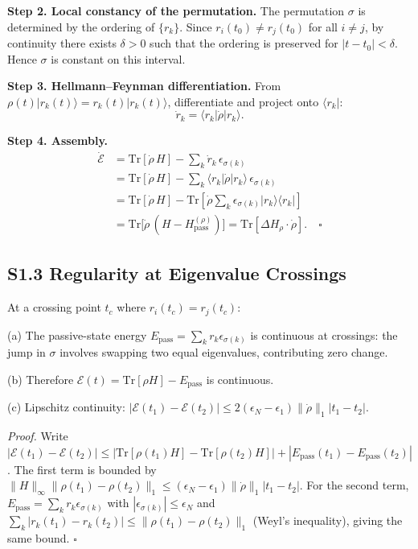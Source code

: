 \documentclass[prl,twocolumn,superscriptaddress,amsmath,amssymb]{revtex4-2}
\begin{document}
\textbf{Step 2. Local constancy of the permutation.}
The permutation $\sigma$ is determined by the ordering of $\{r_k\}$. Since $r_i(t_0) \neq r_j(t_0)$ for all $i \neq j$, by continuity there exists $\delta > 0$ such that the ordering is preserved for $|t - t_0| < \delta$. Hence $\sigma$ is constant on this interval.

\textbf{Step 3. Hellmann--Feynman differentiation.}
From $\rho(t)|r_k(t)\rangle = r_k(t)|r_k(t)\rangle$, differentiate and project onto $\langle r_k|$:
\begin{equation}
\dot r_k = \langle r_k|\dot\rho|r_k\rangle.
\end{equation}

\textbf{Step 4. Assembly.}
\begin{align}
\dot{\mathcal{E}} &= \mathrm{Tr}[\dot\rho\, H] - \sum_k \dot r_k\, \epsilon_{\sigma(k)} \nonumber\\
&= \mathrm{Tr}[\dot\rho\, H] - \sum_k \langle r_k|\dot\rho|r_k\rangle\, \epsilon_{\sigma(k)} \nonumber\\
&= \mathrm{Tr}[\dot\rho\, H] - \mathrm{Tr}\!\left[\dot\rho \sum_k \epsilon_{\sigma(k)}|r_k\rangle\langle r_k|\right] \nonumber\\
&= \mathrm{Tr}\!\bigl[\dot\rho\,(H - H_{\mathrm{pass}}^{(\rho)})\bigr] = \mathrm{Tr}[\Delta H_\rho \cdot \dot\rho]. \quad \square
\end{align}

\subsection{S1.3 Regularity at Eigenvalue Crossings}

At a crossing point $t_c$ where $r_i(t_c) = r_j(t_c)$:

(a) The passive-state energy $E_{\mathrm{pass}} = \sum_k r_k \epsilon_{\sigma(k)}$ is continuous at crossings: the jump in $\sigma$ involves swapping two equal eigenvalues, contributing zero change.

(b) Therefore $\mathcal{E}(t) = \mathrm{Tr}[\rho H] - E_{\mathrm{pass}}$ is continuous.

(c) Lipschitz continuity: $|\mathcal{E}(t_1) - \mathcal{E}(t_2)| \leq 2(\epsilon_N - \epsilon_1)\|\dot\rho\|_1|t_1-t_2|$.

\textit{Proof.} Write $|\mathcal{E}(t_1)-\mathcal{E}(t_2)| \leq |\mathrm{Tr}[\rho(t_1)H] - \mathrm{Tr}[\rho(t_2)H]| + |E_{\mathrm{pass}}(t_1)-E_{\mathrm{pass}}(t_2)|$. The first term is bounded by $\|H\|_\infty \|\rho(t_1)-\rho(t_2)\|_1 \leq (\epsilon_N-\epsilon_1)\|\dot\rho\|_1|t_1-t_2|$. For the second term, $E_{\mathrm{pass}} = \sum_k r_k \epsilon_{\sigma(k)}$ with $|\epsilon_{\sigma(k)}| \leq \epsilon_N$ and $\sum_k|r_k(t_1)-r_k(t_2)| \leq \|\rho(t_1)-\rho(t_2)\|_1$ (Weyl's inequality), giving the same bound. $\square$
\end{document}
